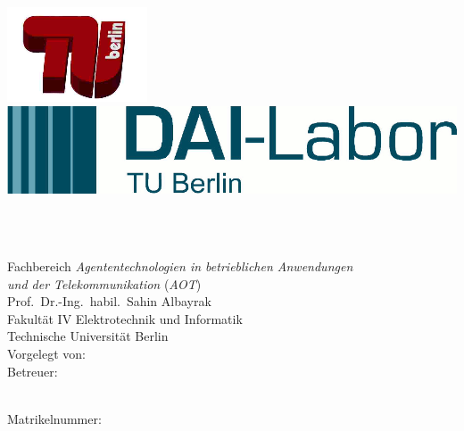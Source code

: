 
\thispagestyle{empty}

\begin{center}

	\includegraphics[scale=0.5]{images/TuLogo.png}
	\hfill
	\includegraphics[scale=0.7]{images/DAI_Logo.png}

	\vspace{1cm}
	\textbf{\ARTDERARBEIT} \\

	\vspace{2cm}
	\textbf{\LARGE \TITELA}\\
	\vspace{0.2cm}
	\textbf{\LARGE \TITELB}

	\vspace{2cm}
	Fachbereich \emph{Agententechnologien in betrieblichen Anwendungen\\
	und der Telekommunikation} (\emph{AOT})\\
	\vspace{0.5cm}
	Prof.\ Dr.-Ing.\ habil.\ Sahin Albayrak \\
	Fakult\"{a}t IV Elektrotechnik und Informatik \\
	Technische Universit\"{a}t Berlin \\

	\vspace{2cm}
	Vorgelegt von: \textbf{\AUTOR} \\
	\vspace{0.5cm}
	Betreuer: \BETREUER \\

\end{center}

\vfill
\AUTOR \\
Matrikelnummer:  \MATRIKEL \\
\ADRESSE \\

\newpage


